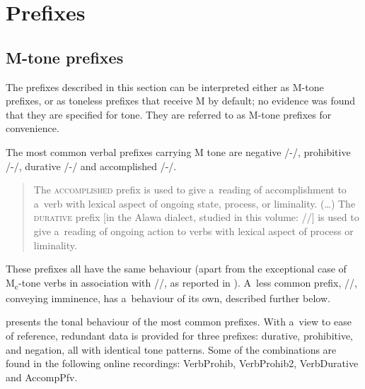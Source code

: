 \section{Prefixes}
\label{sec:prefixes}

\subsection{M-tone prefixes}
\label{sec:mtoneprefixes}

The prefixes described in this section can be interpreted either as M-tone prefixes, or as toneless
prefixes that receive M by default; no evidence was found that they are specified for tone. They are
referred to as M-tone prefixes for convenience.

The most common verbal prefixes carrying M tone are negative /-/, prohibitive /-/, durative /-/ and accomplished /-/.

\begin{quotation}
	The \textsc{accomplished} prefix  is used to give a~reading of
	accomplishment to a~verb with lexical aspect of ongoing state, process, or liminality. ({\dots})
	The \textsc{durative} prefix  [in the Alawa dialect, studied in this volume: //] is used to give a~reading of
	ongoing action to verbs with lexical aspect of process or liminality. \citep[345]{lidz2010}
\end{quotation}
  
These prefixes all have the same behaviour (apart from the exceptional case of M\textsubscript{c}-tone verbs in association with
//, as reported in ). A~less common prefix, //, conveying imminence,
has a~behaviour of its own, described further below.

 presents the tonal behaviour of the most common prefixes. With a~view to ease of reference,
redundant data is provided for three prefixes: {durative}, {prohibitive}, and {negation}, all
with identical tone patterns. Some of the combinations are found in the following online recordings: VerbProhib, VerbProhib2, VerbDurative and AccompPfv.

